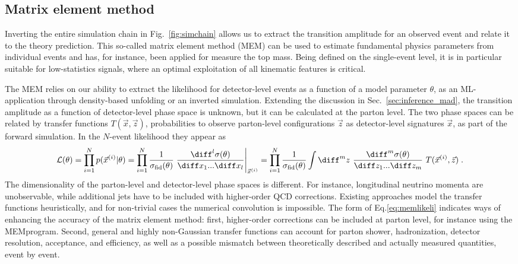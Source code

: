 \documentclass[submission,Phys]{SciPost}
\begin{document}
\subsection{Matrix element method}
\label{sec:inference_mem}

Inverting the entire simulation chain in Fig.~\ref{fig:simchain} allows us to extract the transition amplitude for an observed event and relate it to the theory prediction. This so-called matrix element method (MEM) can be used to estimate fundamental physics parameters from individual events and has, for instance, been applied for measure the top mass. Being defined on the single-event level, it is in particular suitable for low-statistics signals, where an optimal exploitation of all kinematic features is critical.  

The MEM relies on our ability to extract the likelihood for detector-level events as a function of a model parameter $\theta$, as an ML-application through density-based unfolding or an inverted simulation. Extending the discussion in Sec.~\ref{sec:inference_mad}, the transition amplitude as a function of detector-level phase space is unknown, but it can be calculated at the parton level. The two phase spaces can be related by transfer functions $T(\vec{x},\vec{z})$, probabilities to observe parton-level configurations $\vec{z}$ as detector-level signatures $\vec{x}$, as part of the forward simulation. In the $N$-event likelihood they appear as
%
\begin{align}
  \mathcal{L(\theta)}
  =\prod\limits_{i=1}^N p(\vec{x}^{(i)}|\theta) 
  =\prod\limits_{i=1}^N\frac{1}{\sigma_\text{fid}(\theta)}
  \left. \frac{\diff^l\sigma(\theta)}{\diff x_1...\diff x_l} \right|_{\vec{x}^{(i)}}
  =\prod\limits_{i=1}^N\frac{1}{\sigma_\text{fid}(\theta)}\int \diff^mz~ 
 \frac{\diff^m\sigma(\theta)}{\diff z_1...\diff z_m}~T(\vec{x}^{(i)},\vec{z}) \; .
\label{eq:memlikeli}
\end{align}
%
The dimensionality of the parton-level and detector-level phase spaces is different. For instance, longitudinal neutrino momenta are unobservable, while additional jets have to be included with higher-order QCD corrections. Existing approaches model the transfer functions heuristically, and for non-trivial cases the numerical convolution is impossible. The form of Eq.\eqref{eq:memlikeli} indicates ways of enhancing the accuracy of the matrix element method: first, higher-order corrections can be included at parton level, for instance using the MEM\@@NLO program. Second, general and highly non-Gaussian transfer functions can account for parton shower, hadronization, detector resolution, acceptance, and efficiency, as well as a possible mismatch between theoretically described and actually measured quantities, event by event.
\end{document}

